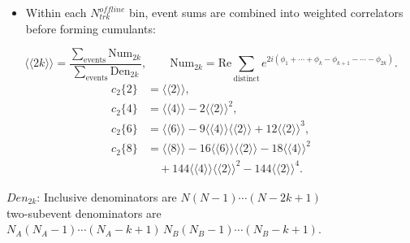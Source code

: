 \documentclass[aspectratio=169,10pt]{beamer}
\newcommand{\slidehead}[1]{%
  \begin{center}\vspace{-0.2em}{\Large\bfseries #1}\end{center}\vspace{0.3em}
}
\begin{document}
\begin{frame}
\slidehead{Cumulant Definitions}
\begin{itemize}\setlength\itemsep{0.45em}
  \item Within each \(N_{trk}^{offline}\) bin, event sums are combined into weighted correlators before forming cumulants:
\end{itemize}
\vspace{-0.6em}
{\small
\[
\langle\!\langle 2k\rangle\!\rangle =
\frac{\sum_{\mathrm{events}} \mathrm{Num}_{2k}}{\sum_{\mathrm{events}} \mathrm{Den}_{2k}},\qquad
\mathrm{Num}_{2k}=\mathrm{Re}\sum_{\mathrm{distinct}} e^{2i(\phi_1+\cdots+\phi_k-\phi_{k+1}-\cdots-\phi_{2k})} .
\]
}
\vspace{-0.5em}
{\footnotesize
\[
\begin{aligned}
c_2\{2\} &= \langle\!\langle 2\rangle\!\rangle,\\
c_2\{4\} &= \langle\!\langle 4\rangle\!\rangle - 2\langle\!\langle 2\rangle\!\rangle^2,\\
c_2\{6\} &= \langle\!\langle 6\rangle\!\rangle
  -9\langle\!\langle 4\rangle\!\rangle\langle\!\langle 2\rangle\!\rangle
  +12\langle\!\langle 2\rangle\!\rangle^3,\\
c_2\{8\} &= \langle\!\langle 8\rangle\!\rangle
  -16\langle\!\langle 6\rangle\!\rangle\langle\!\langle 2\rangle\!\rangle
  -18\langle\!\langle 4\rangle\!\rangle^2\\
&\quad +144\langle\!\langle 4\rangle\!\rangle\langle\!\langle 2\rangle\!\rangle^2
  -144\langle\!\langle 2\rangle\!\rangle^4 .
\end{aligned}
\]
}

\vspace{0em}
{\scriptsize $Den_{2k}$:  Inclusive denominators are \(N(N-1)\cdots(N-2k+1)\)\\ two-subevent denominators are \(N_A(N_A-1)\cdots(N_A-k+1)\,N_B(N_B-1)\cdots(N_B-k+1)\).}
\end{frame}
\end{document}
